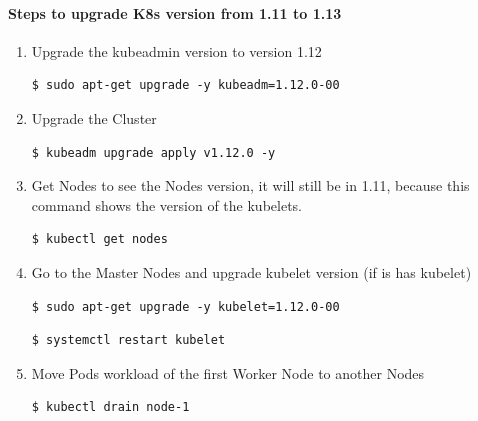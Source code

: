 \documentclass{article}
\newenvironment{codetemplate}[1][]{%
  \mybasecolorbox[#1]
  \itshape
}{%
  \endmybasecolorbox
}
\begin{document}
\paragraph{Steps to upgrade K8s version from 1.11 to 1.13}

\begin{enumerate}

    \item Upgrade the kubeadmin version to version 1.12
\begin{codetemplate}{}
\begin{verbatim}
$ sudo apt-get upgrade -y kubeadm=1.12.0-00
\end{verbatim}
\end{codetemplate}

    \item Upgrade the Cluster
\begin{codetemplate}{}
\begin{verbatim}
$ kubeadm upgrade apply v1.12.0 -y
\end{verbatim}
\end{codetemplate}

    \item Get Nodes to see the Nodes version, it will still be in 1.11, because this command shows the version of the kubelets.
\begin{codetemplate}{}
\begin{verbatim}
$ kubectl get nodes
\end{verbatim}
\end{codetemplate}

    \item Go to the Master Nodes and upgrade kubelet version (if is has kubelet)
\begin{codetemplate}{}
\begin{verbatim}
$ sudo apt-get upgrade -y kubelet=1.12.0-00
\end{verbatim}
\end{codetemplate}
\begin{codetemplate}{}
\begin{verbatim}
$ systemctl restart kubelet
\end{verbatim}
\end{codetemplate}

    \item Move Pods workload of the first Worker Node to another Nodes
\begin{codetemplate}{}
\begin{verbatim}
$ kubectl drain node-1
\end{verbatim}
\end{codetemplate}


\end{enumerate}
\end{document}
